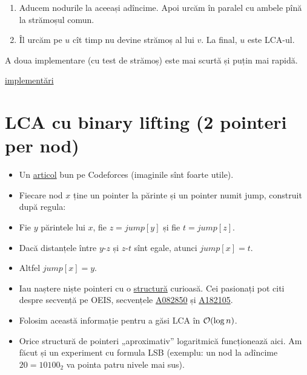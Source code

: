 \documentclass[../main.tex]{subfiles}
\begin{document}
\begin{enumerate}
  \item Aducem nodurile la aceeași adîncime. Apoi urcăm în paralel cu ambele pînă la strămoșul comun.

  \item Îl urcăm pe $u$ cît timp nu devine strămoș al lui $v$. La final, $u$ este LCA-ul.
\end{enumerate}

A doua implementare (cu test de strămoș) este mai scurtă și puțin mai rapidă.

\label{problem:tree-lca-binary-lifting}
\hyperref[code:tree-lca-binary-lifting]{implementări}

\section{LCA cu binary lifting (2 pointeri per nod)}

\begin{itemize}
  \item Un \href{https://codeforces.com/blog/entry/74847}{articol} bun pe Codeforces (imaginile sînt foarte utile).

  \item Fiecare nod $x$ ține un pointer la părinte și un pointer numit jump, construit după regula:

  \item Fie $y$ părintele lui $x$, fie $z = jump[y]$ și fie $t = jump[z]$.

  \item Dacă distanțele între $y$-$z$ și $z$-$t$ sînt egale, atunci $jump[x] = t$.

  \item Altfel $jump[x] = y$.

  \item Iau naștere niște pointeri cu o \href{https://github.com/CatalinFrancu/nerdvana/blob/main/trees/lca/jump-pointer-pattern.cpp}{structură} curioasă. Cei pasionați pot citi despre secvență pe OEIS, secvențele \href{https://oeis.org/A082850}{A082850} și \href{https://oeis.org/A182105}{A182105}.

  \item Folosim această informație pentru a găsi LCA în $\mathcal{O}(\log n)$.

  \item Orice structură de pointeri „aproximativ” logaritmică funcționează aici. Am făcut și un experiment cu formula LSB (exemplu: un nod la adîncime $20 = 10100_2$ va pointa patru nivele mai sus).
\end{itemize}
\end{document}
